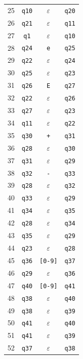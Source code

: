 \begin{longtable}{|r|c|c|c|}
25 & \texttt{q10} & $\varepsilon$ & \texttt{q20} \\
26 & \texttt{q21} & $\varepsilon$ & \texttt{q11} \\
27 & \texttt{q1} & $\varepsilon$ & \texttt{q10} \\
28 & \texttt{q24} & \texttt{e} & \texttt{q25} \\
29 & \texttt{q22} & $\varepsilon$ & \texttt{q24} \\
30 & \texttt{q25} & $\varepsilon$ & \texttt{q23} \\
31 & \texttt{q26} & \texttt{E} & \texttt{q27} \\
32 & \texttt{q22} & $\varepsilon$ & \texttt{q26} \\
33 & \texttt{q27} & $\varepsilon$ & \texttt{q23} \\
34 & \texttt{q11} & $\varepsilon$ & \texttt{q22} \\
35 & \texttt{q30} & \texttt{+} & \texttt{q31} \\
36 & \texttt{q28} & $\varepsilon$ & \texttt{q30} \\
37 & \texttt{q31} & $\varepsilon$ & \texttt{q29} \\
38 & \texttt{q32} & \texttt{-} & \texttt{q33} \\
39 & \texttt{q28} & $\varepsilon$ & \texttt{q32} \\
40 & \texttt{q33} & $\varepsilon$ & \texttt{q29} \\
41 & \texttt{q34} & $\varepsilon$ & \texttt{q35} \\
42 & \texttt{q28} & $\varepsilon$ & \texttt{q34} \\
43 & \texttt{q35} & $\varepsilon$ & \texttt{q29} \\
44 & \texttt{q23} & $\varepsilon$ & \texttt{q28} \\
45 & \texttt{q36} & \texttt{[0-9]} & \texttt{q37} \\
46 & \texttt{q29} & $\varepsilon$ & \texttt{q36} \\
47 & \texttt{q40} & \texttt{[0-9]} & \texttt{q41} \\
48 & \texttt{q38} & $\varepsilon$ & \texttt{q40} \\
49 & \texttt{q38} & $\varepsilon$ & \texttt{q39} \\
50 & \texttt{q41} & $\varepsilon$ & \texttt{q40} \\
51 & \texttt{q41} & $\varepsilon$ & \texttt{q39} \\
52 & \texttt{q37} & $\varepsilon$ & \texttt{q38} \\
\bottomrule
\end{longtable}

